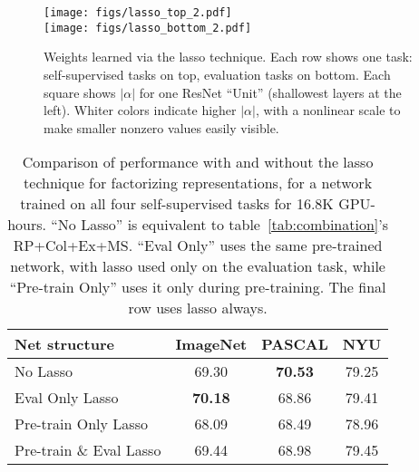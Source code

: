 \documentclass[10pt,twocolumn,letterpaper]{article}
\begin{document}
\begin{figure}[t]
\begin{center}

   \texttt{[image: figs/lasso\_top\_2.pdf]}\\
   \texttt{[image: figs/lasso\_bottom\_2.pdf]}
\end{center}

   \caption{
Weights learned via the lasso technique.  Each row
shows one task: self-supervised tasks on top, evaluation tasks on bottom.  Each square shows $|\alpha|$
for one ResNet ``Unit'' (shallowest layers at the
left).  Whiter colors indicate higher $|\alpha|$, with a nonlinear scale
to make smaller nonzero values easily visible.}

\label{fig:lasso_alpha}
\end{figure}

\begin{table}

\begin{center}
\begin{tabular}{l|c|c|c}
\hline
Net structure & ImageNet & PASCAL & NYU\\
\hline\hline
No Lasso & 69.30 & \textbf{70.53} & 79.25\\
\hline
Eval Only Lasso & \textbf{70.18} & 68.86 & 79.41\\
\hline
Pre-train Only Lasso & 68.09 & 68.49 & 78.96\\
\hline
Pre-train \& Eval Lasso & 69.44 & 68.98 & 79.45\\
\hline
\end{tabular}
\end{center}


\caption{Comparison of performance with and without the lasso technique for factorizing representations, for a network trained on all four self-supervised tasks for 16.8K GPU-hours.  ``No Lasso'' is equivalent to table~\ref{tab:combination}'s RP+Col+Ex+MS.  ``Eval Only'' uses the same pre-trained network, with lasso used only on the evaluation task, while ``Pre-train Only'' uses it only during pre-training.  The final row uses lasso always.  
}

\label{tab:lasso_perf}
\end{table}
\end{document}

